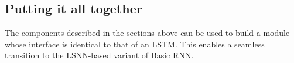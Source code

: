 \documentclass[../../report.tex]{subfiles}
\begin{document}
\subsection{Putting it all together}

The components described in the sections above can be used to build a module
whose interface is identical to that of an LSTM. This enables a seamless
transition to the LSNN-based variant of Basic RNN.


\end{document}
